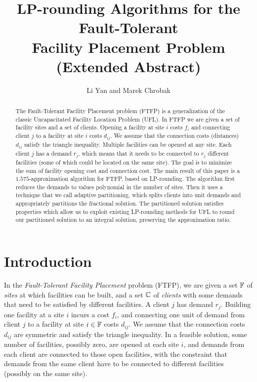 \documentclass{llncs}
\title{LP-rounding Algorithms for the Fault-Tolerant\\
 		Facility Placement Problem (Extended Abstract)}
\author{Li Yan and Marek Chrobak}
\institute{Department of Computer Science, University of California at Riverside}
\date{}
\begin{document}
\maketitle

\begin{abstract} 
  The Fault-Tolerant Facility Placement problem (FTFP) is a
  generalization of the classic Uncapacitated Facility Location
  Problem (UFL). In FTFP we are given a set of facility sites and a
  set of clients. Opening a facility at site $i$ costs $f_i$ and
  connecting client $j$ to a facility at site $i$ costs $d_{ij}$. We
  assume that the connection costs (distances) $d_{ij}$ satisfy the
  triangle inequality. Multiple facilities can be opened at any
  site. Each client $j$ has a demand $r_j$, which means that it needs
  to be connected to $r_j$ different facilities (some of which could
  be located on the same site). The goal is to minimize the sum of
  facility opening cost and connection cost. The main result of this
  paper is a $1.575$-approximation algorithm for FTFP, based on
  LP-rounding. The algorithm first reduces the demands to values
  polynomial in the number of sites. Then it uses a technique that we
  call adaptive partitioning, which splits clients into unit demands
   and appropriately partitions the
fractional solution. The partitioned solution satisfies properties
  which allow us to exploit existing LP-rounding methods for UFL to
  round our partitioned solution to an integral solution, preserving
  the approximation ratio. 
\end{abstract}

\section{Introduction}

In the \emph{Fault-Tolerant Facility Placement} problem
(FTFP), we are given a set $\mathbb{F}$ of \emph{sites} at
which facilities can be built, and a set $\mathbb{C}$ of
\emph{clients} with some demands that need to be satisfied
by different facilities. A client $j$ has demand
$r_j$. Building one facility at a site $i$ incurs a cost
$f_i$, and connecting one unit of demand from client $j$ to
a facility at site $i\in\mathbb{F}$ costs $d_{ij}$.
We assume that the connection costs $d_{ij}$ are
symmetric and satisfy the triangle inequality. In a feasible solution, some
number of facilities, possibly zero, are opened at each site
$i$, and demands from each client are connected to those
open facilities, with the constraint that demands from the
same client have to be connected to different
facilities (possibly on the same site).
\end{document}
